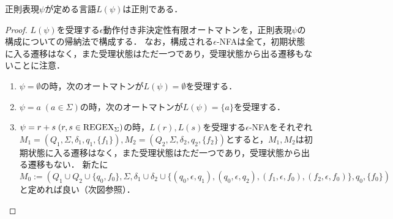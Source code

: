 \documentclass[uplatex, dvipdfmx]{jsreport}
\begin{document}
\begin{theorem}
    正則表現$\psi$が定める言語$L(\psi)$は正則である．
\end{theorem}
\begin{proof}
    $L(\psi)$を受理する$\epsilon$動作付き非決定性有限オートマトンを，正則表現$\psi$の構成についての帰納法で構成する．
    なお，構成される$\epsilon$-NFAは全て，初期状態に入る遷移はなく，また受理状態はただ一つであり，受理状態から出る遷移もないことに注意．
    \begin{enumerate}
        \item $\psi=\emptyset$の時，次のオートマトンが$L(\psi)=\emptyset$を受理する．
        \begin{center}
        \end{center}
        \item $\psi=a\;(a\in\Sigma)$の時，次のオートマトンが$L(\psi)=\{a\}$を受理する．
        \begin{center}
        \end{center}
        \item $\psi=r+s\;(r,s\in\mathrm{REGEX}_\Sigma)$の時，$L(r),L(s)$を受理する$\epsilon$-NFAをそれぞれ$M_1=(Q_1,\Sigma,\delta_1,q_1,\{f_1\}),M_2=(Q_2,\Sigma,\delta_2,q_2,\{f_2\})$とすると，$M_1,M_2$は初期状態に入る遷移はなく，また受理状態はただ一つであり，受理状態から出る遷移もない．
        新たに$M_0:=(Q_1\cup Q_2\cup\{q_0,f_0\},\Sigma,\delta_1\cup\delta_2\cup\{(q_0,\epsilon,q_1),(q_0,\epsilon,q_2),(f_1,\epsilon,f_0),(f_2,\epsilon,f_0)\},q_0,\{f_0\})$と定めれば良い（次図参照）．
        \begin{center}
\end{center}
\end{enumerate}
\end{proof}
\end{document}

